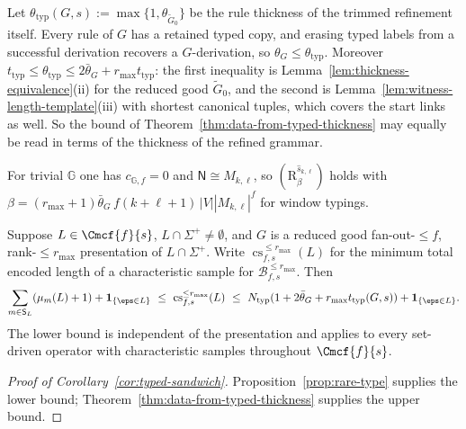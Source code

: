 
\begin{remark}
\label{lem:typed-thickness-equivalence}
Let $\theta_{\mathrm{typ}}(G,s):=\max\{1,\theta_{\widetilde G_0}\}$ be the rule thickness
of the trimmed refinement itself.  Every rule of $G$ has a retained typed copy, and
erasing typed labels from a successful derivation recovers a $G$-derivation, so
$\theta_G\le\theta_{\mathrm{typ}}$.  Moreover
$t_{\mathrm{typ}}\le\theta_{\mathrm{typ}}\le2\bar\theta_G+r_{\max}t_{\mathrm{typ}}$: the first
inequality is Lemma~\ref{lem:thickness-equivalence}(ii) for the reduced good
$\widetilde G_0$, and the second is Lemma~\ref{lem:witness-length-template}(iii) with
shortest canonical tuples, which covers the start links as well.  So the bound of
Theorem~\ref{thm:data-from-typed-thickness} may equally be read in terms of the
thickness of the refined grammar.
\end{remark}


\begin{remark}
\label{lem:boundary-short-canonical}
For trivial ${\mathbb G}$ one has $c_{{\mathbb G},f}=0$ and $\mathsf N\cong M_{k,\ell}$, so
$(\mathrm R_\beta^{\widehat s_{k,\ell}})$ holds with
$\beta=(r_{\max}+1)\bar\theta_G\,f(k+\ell+1)\,|V||M_{k,\ell}|^f$ for window typings.
\end{remark}


\begin{corollary}
\label{cor:typed-sandwich}
Suppose $L\in\Cmcf{f}{s}$, $L\cap\Sigma^+\ne\emptyset$,
and $G$ is a reduced good fan-out-$\le f$, rank-$\le r_{\max}$
presentation of $L\cap\Sigma^+$. Write
$\operatorname{cs}^{\le r_{\max}}_{f,s}(L)$ for the minimum total
encoded length of a characteristic sample for
$\mathcal B^{\le r_{\max}}_{f,s}$. Then
\[
 \sum_{m\in \mathsf S_L}(\mu_m(L)+1)+\mathbf 1_{\{\eps\in L\}}
 \ \le\ \operatorname{cs}^{\le r_{\max}}_{f,s}(L)
 \ \le\ N_{\mathrm{typ}}
  (1+2\bar\theta_G+r_{\max}t_{\mathrm{typ}}(G,s))
 +\mathbf 1_{\{\eps\in L\}}.
\]
The lower bound is independent of the presentation and applies to
every set-driven operator with characteristic samples throughout
$\Cmcf{f}{s}$.
\end{corollary}


\begin{proof}[Proof of Corollary~\ref{cor:typed-sandwich}]
Proposition~\ref{prop:rare-type} supplies the lower bound;
Theorem~\ref{thm:data-from-typed-thickness} supplies the upper bound.
\end{proof}


